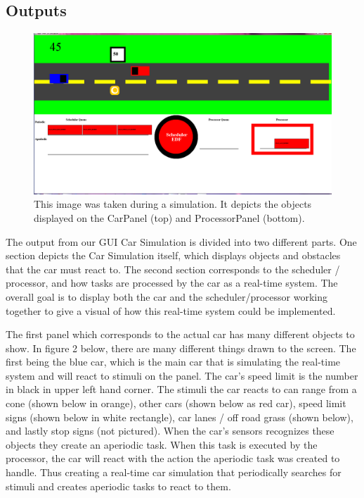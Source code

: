 \documentclass{article} %
\begin{document}
\subsection{Outputs}
\begin{figure}[!hbt]
\begin{center}
\includegraphics[width=\textwidth,keepaspectratio]{gui_car.png}
\end{center}
\caption{This image was taken during a simulation. It depicts the objects displayed on the CarPanel (top) and ProcessorPanel (bottom).}
\label{FIG-SIMULATION}
\end{figure}
The output from our GUI Car Simulation is divided into two different parts.  One 
section depicts the Car Simulation itself, which displays objects and obstacles that 
the car must react to.  The second section corresponds to the scheduler / processor, 
and how tasks are processed by the car as a real-time system.  The overall goal is to 
display both the car and the scheduler/processor working together to give a visual 
of how this real-time system could be implemented.  

The first panel which corresponds to the actual car has many different objects to 
show.  In figure 2 below, there are many different things drawn to the screen.  The 
first being the blue car, which is the main car that is simulating the real-time system 
and will react to stimuli on the panel.  The car’s speed limit is the number in black in 
upper left hand corner.   The stimuli the car reacts to can range from a cone (shown 
below in orange), other cars (shown below as red car), speed limit signs (shown 
below in white rectangle), car lanes / off road grass (shown below), and lastly stop 
signs (not pictured).  When the car’s sensors recognizes these objects they create an 
aperiodic task.  When this task is executed by the processor, the car will react with 
the action the aperiodic task was created to handle.  Thus creating a real-time car 
simulation that periodically searches for stimuli and creates aperiodic tasks to react 
to them.  
\end{document}
